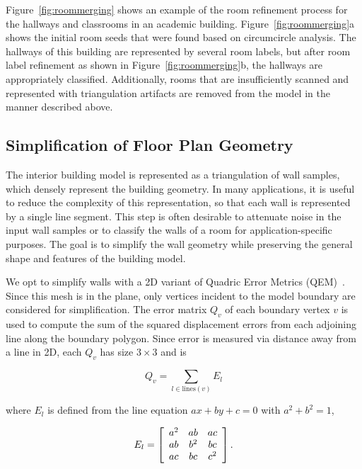 \documentclass[12pt,onecolumn,oneside]{book}
\begin{document}
Figure~\ref{fig:roommerging} shows an example of the room refinement process for the hallways and classrooms in an academic building. Figure~\ref{fig:roommerging}a shows the initial room seeds that were found based on circumcircle analysis.  The hallways of this building are represented by several room labels, but after room label refinement as shown in Figure~\ref{fig:roommerging}b, the hallways are appropriately classified.  Additionally, rooms that are insufficiently scanned and represented with triangulation artifacts are removed from the model in the manner described above.

\subsection{Simplification of Floor Plan Geometry}
\label{ssec:fp_simplify}

The interior building model is represented as a triangulation of wall samples, which densely represent the building geometry.  In many applications, it is useful to reduce the complexity of this representation, so that each wall is represented by a single line segment.  This step is often desirable to attenuate noise in the input wall samples or to classify the walls of a room for application-specific purposes.  The goal is to simplify the wall geometry while preserving the general shape and features of the building model.

We opt to simplify walls with a 2D variant of Quadric Error Metrics (QEM)~\cite{QEM,Turner14}.  Since this mesh is in the plane, only vertices incident to the model boundary are considered for simplification.  The error matrix $Q_v$ of each boundary vertex $v$ is used to compute the sum of the squared displacement errors from each adjoining line along the boundary polygon.  Since error is measured via distance away from a line in 2D, each $Q_v$ has size $3 \times 3$ and is

\begin{equation}
Q_v = \sum_{l \in \mathrm{lines}(v)} E_l
\end{equation}

\noindent where $E_l$ is defined from the line equation $ax + by + c = 0$ with $a^2 + b^2 = 1$,

\begin{equation}
E_l = \left[ \begin{array}{c c c}
a^2 & ab & ac \\
ab & b^2 & bc \\
ac & bc & c^2 \end{array} \right].
\end{equation}
\end{document}
